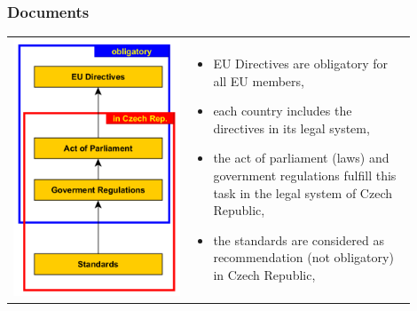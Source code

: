 \documentclass{beamer}
\begin{document}
	\begin{frame}
    \frametitle{Documents}
		\small
		\begin{center}
			\begin{tabular}{m{0.4\linewidth} m{0.5\linewidth}}
			\includegraphics[scale=0.25]{obr02_dokumenty.png} &
			
			\begin{itemize}
				\item EU Directives are obligatory for all EU members,
				\item each country includes the directives in its legal system,
				\item the act of parliament (laws) and government regulations fulfill this task in the legal system of Czech Republic,
				\item the standards are considered as recommendation (not obligatory) in Czech Republic,
			\end{itemize}
			\end{tabular}
		\end{center}
	\end{frame}
\end{document}
